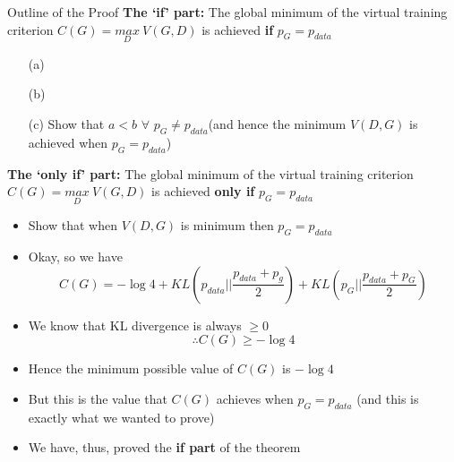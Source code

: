 \begin{frame}
	\begin{block}{Outline of the Proof}
	\textbf{The `if' part:} The global minimum of the virtual training criterion $C(G)=\underset{D}{max} ~V(G,D)$ is achieved \textbf{if} $p_G=p_{data}$
		\begin{enumerate}
			\item[(a)]  \color{black}
			\item[(b)]  \color{black}
			\item[(c)] \alert<2>{Show that $a < b$ $\forall$ $p_G \neq p_{data}$(and hence the minimum $V(D,G)$ is achieved when $p_G=p_{data}$)}
		\end{enumerate}
	\vspace{5mm}
	\textbf{The `only if' part:} The global minimum of the virtual training criterion $C(G)=\underset{D}{max} ~V(G,D)$ is achieved \textbf{only if} $p_G=p_{data}$
	\begin{itemize}
		\item Show that when $V(D,G)$ is minimum then $p_G=p_{data}$
	\end{itemize}
	\end{block}
\end{frame}

\begin{frame}
	\begin{itemize}[<+->]
		\item Okay, so we have 
			$$C(G)=-\log 4 + KL\left(p_{data}||\frac{p_{data}+p_{g}}{2}\right)+KL\left(p_G||\frac{p_{data}+p_G}{2}\right)$$
		\item We know that KL divergence is always $\geq 0$
			$$\therefore C(G) \geq -\log 4$$
		\item Hence the minimum possible value of $C(G)$ is $-\log 4$ 
		\item But this is the value that $C(G)$ achieves when $p_G = p_{data}$ (and this is exactly what we wanted to prove)
		\item We have, thus, proved the \textbf{if part} of the theorem
	\end{itemize}
\end{frame}

